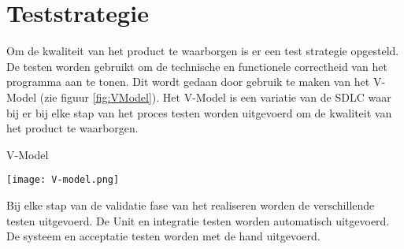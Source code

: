 \section{Teststrategie}
\label{section:Teststrategie}
Om de kwaliteit van het product te waarborgen is er een test strategie opgesteld.
De testen worden gebruikt om de technische en functionele correctheid van het programma aan te tonen.
Dit wordt gedaan door gebruik te maken van het V-Model \parencite{VModel} (zie figuur \ref{fig:VModel}).
Het V-Model is een variatie van de SDLC waar bij er bij elke stap van het proces testen worden uitgevoerd om de kwaliteit van het product te waarborgen.

\whitespace
\begin{graphic}
    \captionsetup{type=figure}
    \caption{V-Model \parencite{VModel}}
    \texttt{[image: V-model.png]}
    \label{fig:VModel}
\end{graphic}

\whitespace
Bij elke stap van de validatie fase van het realiseren worden de verschillende testen uitgevoerd.
De Unit en integratie testen worden automatisch uitgevoerd.
De systeem en acceptatie testen worden met de hand uitgevoerd.
